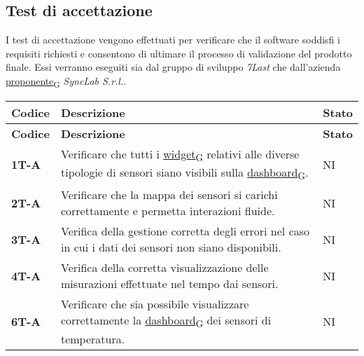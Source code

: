 \subsection{Test di accettazione}
I test di accettazione vengono effettuati per verificare che il software soddisfi i requisiti richiesti e consentono di ultimare il processo di validazione del prodotto finale.
Essi verranno eseguiti sia dal gruppo di sviluppo \textit{7Last} che dall'azienda \href{https://7last.github.io/docs/rtb/documentazione-interna/glossario\#proponente}{proponente\textsubscript{G}} \textit{SyncLab S.r.l.}. \\
\begin{longtable}{|>{\raggedright\arraybackslash}m{}|>{\raggedright\arraybackslash}m{}|>{\raggedright\arraybackslash}m{}|}
	\hline
	\textbf{Codice} & \textbf{Descrizione}                                                                                                   & \textbf{Stato} \\
	\hline
	\endfirsthead
	\hline
	\textbf{Codice} & \textbf{Descrizione}                                                                                                   & \textbf{Stato} \\
	\endhead
	\textbf{1T-A}   & Verificare che tutti i \href{https://7last.github.io/docs/rtb/documentazione-interna/glossario\#widget}{widget\textsubscript{G}} relativi alle diverse tipologie di sensori siano visibili sulla \href{https://7last.github.io/docs/rtb/documentazione-interna/glossario\#dashboard}{dashboard\textsubscript{G}}.               & NI             \\
	\hline
	\textbf{2T-A}   & Verificare che la mappa dei sensori si carichi correttamente e permetta interazioni fluide.                            & NI             \\
	\hline
	\textbf{3T-A}   & Verifica della gestione corretta degli errori nel caso in cui i dati dei sensori non siano disponibili.                & NI             \\
	\hline
	\textbf{4T-A}   & Verifica della corretta visualizzazione delle misurazioni effettuate nel tempo dai sensori.                            & NI             \\
	\hline
	\textbf{6T-A}   & Verificare che sia possibile visualizzare correttamente la \href{https://7last.github.io/docs/rtb/documentazione-interna/glossario\#dashboard}{dashboard\textsubscript{G}} dei sensori di temperatura.                       & NI             \\

\end{longtable}
